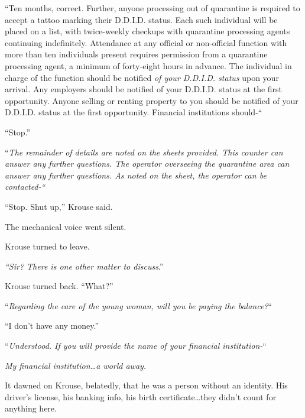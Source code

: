 ``Ten months, correct.  Further, anyone processing out of quarantine is required to accept a tattoo marking their D.D.I.D. status.  Each such individual will be placed on a list, with twice-weekly checkups with quarantine processing agents continuing indefinitely.  Attendance at any official or non-official function with more than ten individuals present requires permission from a quarantine processing agent, a minimum of forty-eight hours in advance.  The individual in charge of the function should be notified \emph{of your D.D.I.D. status }upon your arrival.  Any employers should be notified of your D.D.I.D. status at the first opportunity.  Anyone selling or renting property to you should be notified of your D.D.I.D. status at the first opportunity.  Financial institutions should-``



``Stop.''



``\emph{The remainder of details are noted on the sheets provided.  This counter can answer any further questions.  The operator overseeing the quarantine area can answer any further questions.  As noted on the sheet, the operator can be contacted-``}



``Stop.  Shut up,'' Krouse said.



The mechanical voice went silent.



Krouse turned to leave.



\emph{``Sir?  There is one other matter to discuss}.''



Krouse turned back.  ``What?''



``\emph{Regarding the care of the young woman, will you be paying the balance?}``



``I don't have any money.''



``\emph{Understood.  If you will provide the name of your financial institution-}``



\emph{My financial institution\ldots a world away.}



It dawned on Krouse, belatedly, that he was a person without an identity.  His driver's license, his banking info, his birth certificate\ldots they didn't count for anything here.



